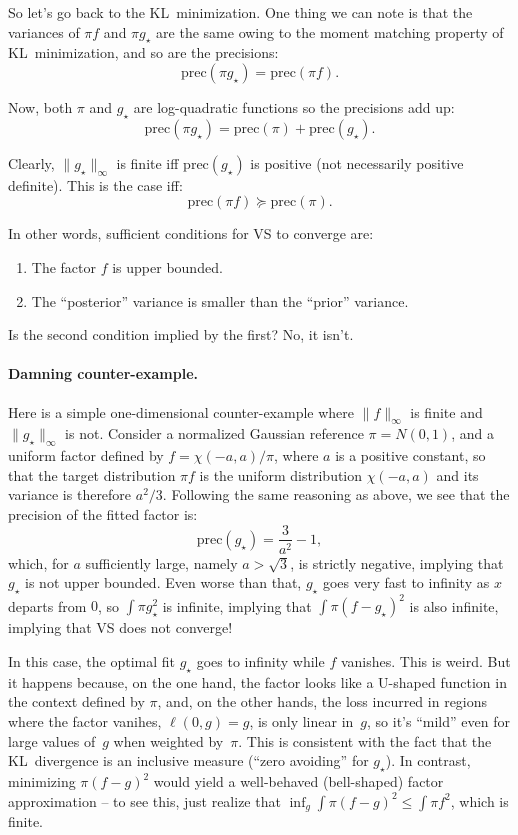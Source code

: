 \documentclass{article}
\def\prec{\mathrm{prec}}
\begin{document}
So let's go back to the KL~minimization. One thing we can note is that the variances of $\pi f$ and $\pi g_\star$ are the same owing to the moment matching property of KL~minimization, and so are the precisions:
$$
\prec(\pi g_\star) = \prec(\pi f).
$$

Now, both $\pi$ and $g_\star$ are log-quadratic functions so the precisions add up:
$$
\prec(\pi g_\star) = \prec(\pi) + \prec(g_\star).
$$

Clearly, $\|g_\star\|_\infty$ is finite iff $\prec(g_\star)$ is positive (not necessarily positive definite). This is the case iff: 
$$
\prec(\pi f) \succeq \prec(\pi)
.
$$

In other words, sufficient conditions for VS to converge are:
\begin{enumerate}
\item The factor $f$ is upper bounded.
\item The ``posterior'' variance is smaller than the ``prior'' variance.
\end{enumerate}

Is the second condition implied by the first? No, it isn't.


\paragraph{Damning counter-example.}

Here is a simple one-dimensional counter-example where $\|f\|_\infty$ is finite and $\|g_\star\|_\infty$ is not. Consider a normalized Gaussian reference $\pi = N(0,1)$, and a uniform factor defined by $f = \chi(-a,a)/\pi$, where $a$ is a positive constant, so that the target distribution $\pi f$ is the uniform distribution $\chi(-a,a)$ and its variance is therefore $a^2/ 3$. Following the same reasoning as above, we see that the precision of the fitted factor is:
$$
\prec(g_\star) = \frac{3}{a^2} - 1,
$$
which, for $a$ sufficiently large, namely $a>\sqrt{3}$, is strictly negative, implying that $g_\star$ is not upper bounded. Even worse than that, $g_\star$ goes very fast to infinity as $x$ departs from $0$, so $\int \pi g_\star^2$ is infinite, implying that $\int \pi (f-g_\star)^2$ is also infinite, implying that VS does not converge! 

In this case, the optimal fit $g_\star$ goes to infinity while $f$ vanishes. This is weird. But it happens because, on the one hand, the factor looks like a U-shaped function in the context defined by $\pi$, and, on the other hands, the loss incurred in regions where the factor vanihes, $\ell(0,g)=g$, is only linear in~$g$, so it's ``mild'' even for large values of~$g$ when weighted by~$\pi$. This is consistent with the fact that the KL~divergence is an inclusive  measure (``zero avoiding'' for $g_\star$). In contrast, minimizing $\pi(f-g)^2$ would yield a well-behaved (bell-shaped) factor approximation -- to see this, just realize that $\inf_g\int\pi(f-g)^2 \leq \int\pi f^2$, which is finite.  
\end{document}
